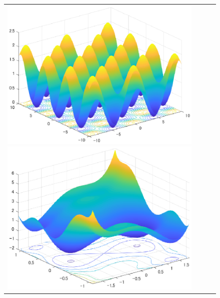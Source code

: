\documentclass{jarticle}
\begin{document}
\begin{figure}[h]
\begin{tabular}{cccc}

\renewcommand{\thefigure}{\alph{figure}}
\begin{minipage}{0.24\hsize}
\centering
\includegraphics[width=1.0\linewidth]{eps/3d_griewank.eps}
\setcounter{figure}{0}
\caption{}
\label{fig:3d_griewank}
\end{minipage} 

\begin{minipage}{0.24\hsize}
\centering
\includegraphics[width=1.0\linewidth]{eps/3d_sixhump_camel.eps}
\caption{}
\label{fig:3d_sixhump}
\end{minipage} 


\end{tabular}
\end{figure}
\end{document}
